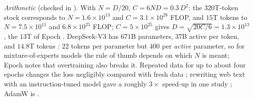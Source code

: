 \begin{beyond}\label{box:L6-numbers}
\emph{Arithmetic} (checked in ). With $N=D/20$, $C=6ND=0.3\,D^2$: the $320$T-token stock corresponds to $N=1.6\times10^{13}$ and $C=3.1\times10^{28}$ FLOP, and $15$T tokens to $N=7.5\times10^{11}$ and $6.8\times10^{25}$ FLOP; $C=5\times10^{25}$ gives $D=\sqrt{20C/6}=1.3\times10^{13}$, the $13$T of Epoch \citep{villalobos2024}. DeepSeek-V3 has $671$B parameters, $37$B active per token, and $14.8$T tokens \citep{deepseek2024}: $22$ tokens per parameter but $400$ per \emph{active} parameter, so for mixture-of-experts models the rule of thumb depends on which $N$ is meant; Epoch notes that overtraining also breaks it. Repeated data for up to about four epochs changes the loss negligibly compared with fresh data \citep{muennighoff2023}; rewriting web text with an instruction-tuned model gave a roughly $3\times$ speed-up in one study \citep{maini2024}; AdamW is \citet{loshchilov2019}.


\end{beyond}
